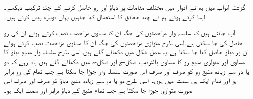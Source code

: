 گزشتہ ابواب میں ہم نے ادوار میں مختلف مقامات پر دباؤ اور رو حاصل کرنے کے چند ترکیب دیکھے۔ایسا کرتے ہوئے ہم نے چند حقائق کا استعمال کیا جنہیں یہاں دوبارہ پیش کرتے ہیں۔

آپ جانتے ہیں کہ سلسلہ وار مزاحمتوں  کی جگہ ان کا مساوی مزاحمت نصب کرتے ہوئے ان کی رو حاصل کی جا سکتی ہے۔اسی طرح متوازی مزاحمتوں کی جگہ ان کا مساوی مزاحمت نصب کرتے ہوئے ان  پر دباؤ حاصل کیا جا سکتا ہے۔یہ عمل شکل  میں دکھائے گئے ہیں۔اسی طرح سلسلہ وار منبع دباؤ کا مساوی اور متوازی منبع رو کا مساوی بالترتیب شکل-ج اور شکل-د میں دکھائے گئے ہیں۔یاد رہے کہ دو یا دو سے زیادہ منبع رو کو صرف اور صرف اس صورت سلسلہ وار جوڑا جا سکتا ہے جب تمام کی رو برابر ہو اور تمام  ایک ہی سمت میں ہوں۔ اسی طرح دو یا دو سے زیادہ منبع دباؤ کو صرف اور صرف اس صورت متوازی جوڑا جا سکتا ہے جب تمام منبع کے دباؤ برابر اور سمت ایک ہو۔

